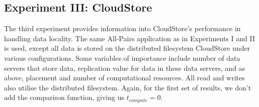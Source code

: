\documentclass{rspublic}
\begin{document}
\vspace{-0.4cm}

\subsection{Experiment III: CloudStore}\label{Sec:CloudStoreExp}

\vspace{-0.1cm}

The third experiment provides information into CloudStore's performance
in handling data locality. The same All-Pairs application as in
Experiments I and II is used, except all data is stored on the
distributed filesystem CloudStore under various configurations. Some
variables of importance include number of data servers that store data,
replication value for data in these data servers, and as above,
placement and number of computational resources. All read and writes
also utilise the distributed filesystem. Again, for the first set of
results, we don't add the comparison function, giving us
$t_{compute}=0$.
\end{document}
